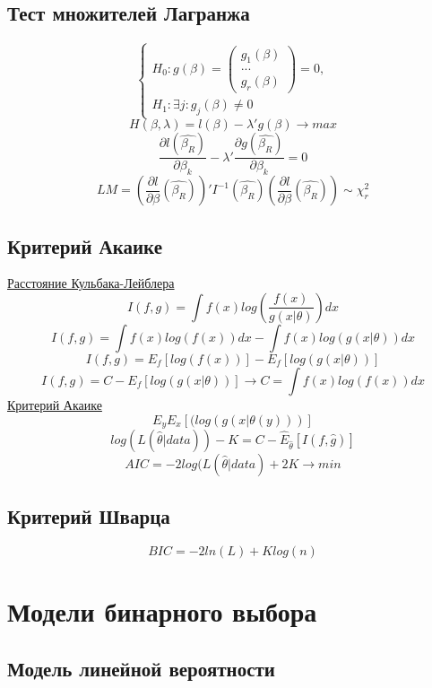 \documentclass[a4paper, 12pt]{article}
\begin{document}
\subsection{Тест множителей Лагранжа}

\[\begin{cases}
    H_{0}: g(\beta) = \begin{pmatrix}g_{1}(\beta) \\ ... \\ g_{r}(\beta) \end{pmatrix} = 0,
    \\
    H_{1}: \exists j: g_{j}(\beta) \neq 0
\end{cases}\]
\[
    H(\beta, \lambda) = l(\beta) - \lambda'g(\beta) \rightarrow max
\]
\[
    \frac{\partial l(\hat{\beta_{R}})}{\partial \beta_{k}} - \lambda' \frac{\partial g(\hat{\beta_{R}})}{\partial \beta_{k}} = 0
\]
\[LM = \left(\frac{\partial l}{\partial \beta}(\hat{\beta_{R}})\right)'I^{-1}(\hat{\beta_{R}})\left(\frac{\partial l}{\partial \beta}(\hat{\beta_{R}})\right) \sim \chi^{2}_{r}\]

\subsection{Критерий Акаике}

\underline{Расстояние Кульбака-Лейблера}
\[I(f, g) = \int f(x)log\left(\frac{f(x)}{g(x|\theta)}\right) dx\]
\[I(f, g) = \int f(x)log(f(x))dx - \int f(x)log(g(x|\theta))dx\]
\[I(f, g) = E_{f}[log(f(x))] - E_{f}[log(g(x|\theta))]\]
\[I(f, g) = C - E_{f}[log(g(x|\theta))] \rightarrow C = \int f(x)log(f(x))dx\]
\underline{Критерий Акаике}
\[E_{y}E_{x}[(log(g(x|\theta(y)))]\]
\[log(L(\hat{\theta}|data)) - K = C - \hat{E}_{\hat{\theta}}[I(f, \hat{g})]\]
\[AIC = -2log(L(\hat{\theta}|data) + 2K \rightarrow min\]

\subsection{Критерий Шварца}
\[BIC = -2ln(L) + Klog(n)\]

\section{Модели бинарного выбора}

\subsection{Модель линейной вероятности}
\end{document}
